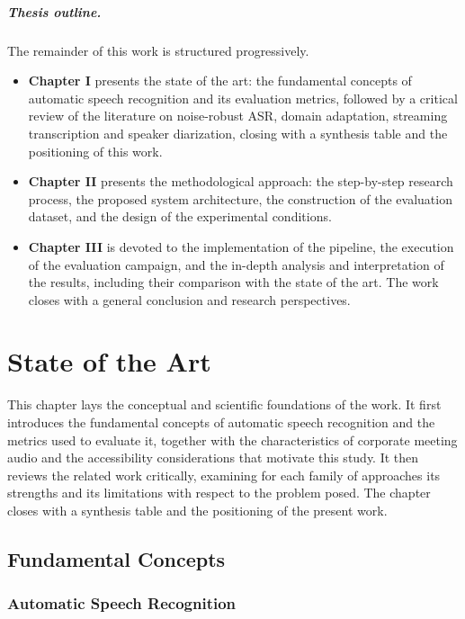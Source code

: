 \documentclass[12pt]{report}
\begin{document}
\paragraph{Thesis outline.}
The remainder of this work is structured progressively.
\begin{itemize}
    \item \textbf{Chapter I} presents the state of the art: the fundamental concepts of automatic speech recognition and its evaluation metrics, followed by a critical review of the literature on noise-robust ASR, domain adaptation, streaming transcription and speaker diarization, closing with a synthesis table and the positioning of this work.
    \item \textbf{Chapter II} presents the methodological approach: the step-by-step research process, the proposed system architecture, the construction of the evaluation dataset, and the design of the experimental conditions.
    \item \textbf{Chapter III} is devoted to the implementation of the pipeline, the execution of the evaluation campaign, and the in-depth analysis and interpretation of the results, including their comparison with the state of the art. The work closes with a general conclusion and research perspectives.
\end{itemize}
\newpage

\chapter{State of the Art}

This chapter lays the conceptual and scientific foundations of the work. It first introduces the fundamental concepts of automatic speech recognition and the metrics used to evaluate it, together with the characteristics of corporate meeting audio and the accessibility considerations that motivate this study. It then reviews the related work critically, examining for each family of approaches its strengths and its limitations with respect to the problem posed. The chapter closes with a synthesis table and the positioning of the present work.

\section{Fundamental Concepts}

\subsection{Automatic Speech Recognition}
\end{document}
